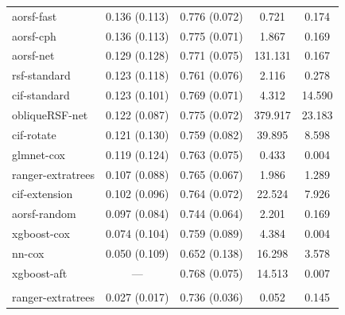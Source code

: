 \documentclass[twoside,11pt]{article}\usepackage[]{graphicx}\usepackage[]{xcolor}
\newenvironment{knitrout}{}{} %
\begin{document}
\begin{knitrout}
\begin{longtable}[t]{lcccc}
\endfoot
\bottomrule
\endlastfoot
\addlinespace[0.3em]
\multicolumn{5}{l}{\textit{\textbf{Overall}}}\\
\hline
\hspace{1em}aorsf-fast & 0.136 (0.113) & 0.776 (0.072) & 0.721 & 0.174\\
\hspace{1em}aorsf-cph & 0.136 (0.113) & 0.775 (0.071) & 1.867 & 0.169\\
\hspace{1em}aorsf-net & 0.129 (0.128) & 0.771 (0.075) & 131.131 & 0.167\\
\hspace{1em}rsf-standard & 0.123 (0.118) & 0.761 (0.076) & 2.116 & 0.278\\
\hspace{1em}cif-standard & 0.123 (0.101) & 0.769 (0.071) & 4.312 & 14.590\\
\hspace{1em}obliqueRSF-net & 0.122 (0.087) & 0.775 (0.072) & 379.917 & 23.183\\
\hspace{1em}cif-rotate & 0.121 (0.130) & 0.759 (0.082) & 39.895 & 8.598\\
\hspace{1em}glmnet-cox & 0.119 (0.124) & 0.763 (0.075) & 0.433 & 0.004\\
\hspace{1em}ranger-extratrees & 0.107 (0.088) & 0.765 (0.067) & 1.986 & 1.289\\
\hspace{1em}cif-extension & 0.102 (0.096) & 0.764 (0.072) & 22.524 & 7.926\\
\hspace{1em}aorsf-random & 0.097 (0.084) & 0.744 (0.064) & 2.201 & 0.169\\
\hspace{1em}xgboost-cox & 0.074 (0.104) & 0.759 (0.089) & 4.384 & 0.004\\
\hspace{1em}nn-cox & 0.050 (0.109) & 0.652 (0.138) & 16.298 & 3.578\\
\hspace{1em}xgboost-aft & --- & 0.768 (0.075) & 14.513 & 0.007\\
\addlinespace[0.3em]
\multicolumn{5}{l}{\textit{\textbf{ACTG 320; AIDS diagnosis, n = 1151, p = 12}}}\\
\hline
\hspace{1em}ranger-extratrees & 0.027 (0.017) & 0.736 (0.036) & 0.052 & 0.145\\

\end{longtable}
\end{knitrout}
\end{document}
